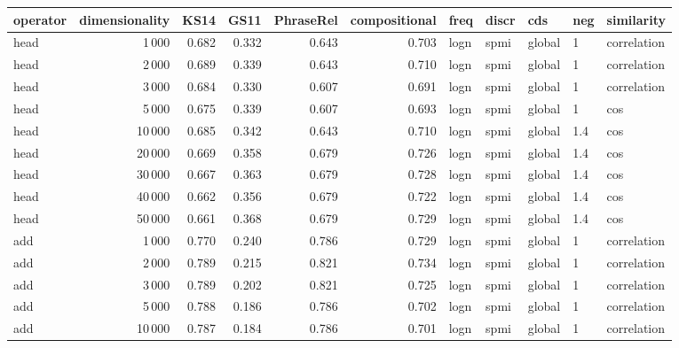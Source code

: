 \begin{tabular}{lrrrrrlllll}
\toprule
operator &  dimensionality &   KS14 &   GS11 &  PhraseRel &  compositional &  freq &  discr &     cds &  neg &     similarity \\
\midrule
    head &            1\,000 &  0.682 &  0.332 &      0.643 &          0.703 &  logn &   spmi &  global &    1 &    correlation \\
    head &            2\,000 &  0.689 &  0.339 &      0.643 &          0.710 &  logn &   spmi &  global &    1 &    correlation \\
    head &            3\,000 &  0.684 &  0.330 &      0.607 &          0.691 &  logn &   spmi &  global &    1 &    correlation \\
    head &            5\,000 &  0.675 &  0.339 &      0.607 &          0.693 &  logn &   spmi &  global &    1 &            cos \\
    head &           10\,000 &  0.685 &  0.342 &      0.643 &          0.710 &  logn &   spmi &  global &  1.4 &            cos \\
    head &           20\,000 &  0.669 &  0.358 &      0.679 &          0.726 &  logn &   spmi &  global &  1.4 &            cos \\
    head &           30\,000 &  0.667 &  0.363 &      0.679 &          0.728 &  logn &   spmi &  global &  1.4 &            cos \\
    head &           40\,000 &  0.662 &  0.356 &      0.679 &          0.722 &  logn &   spmi &  global &  1.4 &            cos \\
    head &           50\,000 &  0.661 &  0.368 &      0.679 &          0.729 &  logn &   spmi &  global &  1.4 &            cos \\
     add &            1\,000 &  0.770 &  0.240 &      0.786 &          0.729 &  logn &   spmi &  global &    1 &    correlation \\
     add &            2\,000 &  0.789 &  0.215 &      0.821 &          0.734 &  logn &   spmi &  global &    1 &    correlation \\
     add &            3\,000 &  0.789 &  0.202 &      0.821 &          0.725 &  logn &   spmi &  global &    1 &    correlation \\
     add &            5\,000 &  0.788 &  0.186 &      0.786 &          0.702 &  logn &   spmi &  global &    1 &    correlation \\
     add &           10\,000 &  0.787 &  0.184 &      0.786 &          0.701 &  logn &   spmi &  global &    1 &    correlation \\

\end{tabular}
